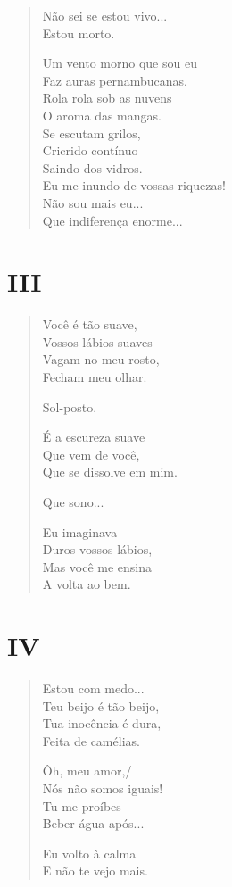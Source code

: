 \begin{verse}
Não sei se estou vivo...\\
Estou morto.

Um vento morno que sou eu\\
Faz auras pernambucanas.\\
Rola rola sob as nuvens\\
O aroma das mangas.\\
Se escutam grilos,\\
Cricrido contínuo\\
Saindo dos vidros.\\
Eu me inundo de vossas riquezas!\\
Não sou mais eu...\\

Que indiferença enorme...
\end{verse}

\pagebreak
\section{III}

\begin{verse}
Você é tão suave,\\
Vossos lábios suaves\\
Vagam no meu rosto,\\
Fecham meu olhar.

Sol-posto.

É a escureza suave\\
Que vem de você,\\
Que se dissolve em mim.

Que sono...

Eu imaginava\\
Duros vossos lábios,\\
Mas você me ensina\\
A volta ao bem.
\end{verse}

\pagebreak
\section{IV}

\begin{verse}
Estou com medo...\\
Teu beijo é tão beijo,\\
Tua inocência é dura,\\
Feita de camélias.

Ôh, meu amor,/\\
Nós não somos iguais!\\
Tu me proíbes\\
Beber água após...

Eu volto à calma\\
E não te vejo mais.
\end{verse}

